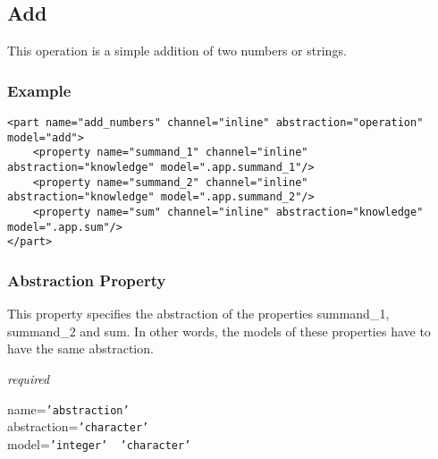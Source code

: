 %
%
%
%
%
%

\subsection{Add}
\label{add_heading}

This operation is a simple addition of two numbers or strings.

\subsubsection{Example}

\begin{scriptsize}
    \begin{verbatim}
<part name="add_numbers" channel="inline" abstraction="operation" model="add">
    <property name="summand_1" channel="inline" abstraction="knowledge" model=".app.summand_1"/>
    <property name="summand_2" channel="inline" abstraction="knowledge" model=".app.summand_2"/>
    <property name="sum" channel="inline" abstraction="knowledge" model=".app.sum"/>
</part>
    \end{verbatim}
\end{scriptsize}

\subsubsection{Abstraction Property}

This property specifies the abstraction of the properties summand\_1,
summand\_2 and sum. In other words, the models of these properties have to have
the same abstraction.

\emph{required}

name=\texttt{'abstraction'}\\
abstraction=\texttt{'character'}\\
model=\texttt{'integer' \vline\ 'character'}

